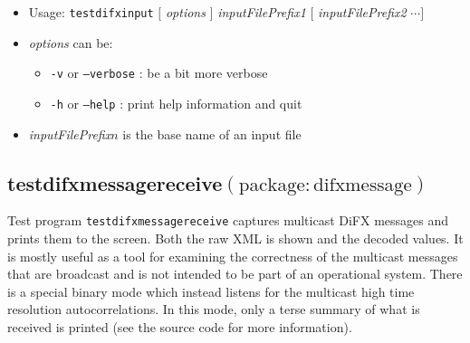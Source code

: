 \begin{itemize}
\item[] Usage: {\tt testdifxinput} $[$ {\em options} $]$ {\em inputFilePrefix1} $[$ {\em inputFilePrefix2} $ \cdots ]$
\item[] {\em options} can be:
\begin{itemize}
\item[] {\tt -v} or {\tt --verbose} : be a bit more verbose
\item[] {\tt -h} or {\tt --help} : print help information and quit
\end{itemize}
\item[] {\em inputFilePrefix}$n$ is the base name of an input file
\end{itemize}







\subsection{testdifxmessagereceive{\small $\mathrm{(package: difxmessage)}$}} \label{sec:testdifxmessagereceive}

Test program {\tt testdifxmessagereceive} captures multicast DiFX messages and prints them to the screen.
Both the raw XML is shown and the decoded values.
It is mostly useful as a tool for examining the correctness of the multicast messages that are broadcast and is not intended to be part of an operational system.
There is a special binary mode which instead listens for the multicast high time resolution autocorrelations.
In this mode, only a terse summary of what is received is printed (see the source code for more information).

